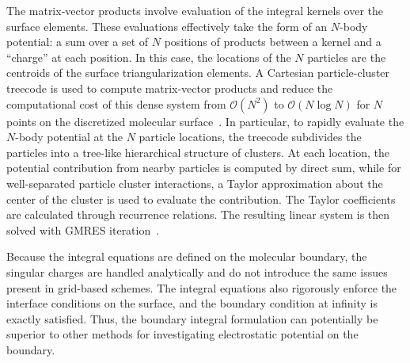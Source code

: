 \documentclass[12pt,titlepage]{article}
\begin{document}
The matrix-vector products involve evaluation of the integral kernels over the surface elements.
These evaluations effectively take the form of an $N$-body potential: a sum over a set of $N$ positions of products between a kernel and a ``charge'' at each position.
In this case, the locations of the $N$ particles are the centroids of the surface triangularization elements.
A Cartesian particle-cluster treecode is used to compute matrix-vector products and reduce the computational cost of this dense system from $\mathcal{O}(N^2)$ to $\mathcal{O}(N\log N)$ for $N$ points on the discretized molecular surface~\cite{Li2009}.
In particular, to rapidly evaluate the $N$-body potential at the $N$ particle locations, the treecode subdivides the particles into a tree-like hierarchical structure of clusters.
At each location, the potential contribution from nearby particles is computed by direct sum, while for well-separated particle cluster interactions, a Taylor approximation about the center of the cluster is used to evaluate the contribution.
The Taylor coefficients are calculated through recurrence relations.
The resulting linear system is then solved with GMRES iteration~\cite{Saad1986}.

Because the integral equations are defined on the molecular boundary, the singular charges are handled analytically and do not introduce the same issues present in grid-based schemes.
The integral equations also rigorously enforce the interface conditions on the surface, and the boundary condition at infinity is exactly satisfied.
Thus, the boundary integral formulation can potentially be superior to other methods for investigating electrostatic potential on the boundary.
\end{document}

